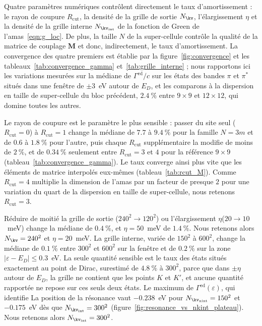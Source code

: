 Quatre paramètres numériques contrôlent directement le taux d'amortissement : le rayon de coupure $R_\text{cut}$, la densité de la grille de sortie $N_\kv$, l'élargissement $\eta$ et la densité de la grille interne $N_{\kv_\text{int}}$ de la fonction de Green de l'amas~\eqref{eqn:g_loc}. De plus, la taille $N$ de la super-cellule contrôle la qualité de la matrice de couplage $\bm M$ et donc, indirectement, le taux d'amortissement. La convergence des quatre premiers est établie par la figure~\ref{fig:convergence} et les tableaux~\ref{tab:convergence_gamma} et~\ref{tab:grille_interne} ; nous rapportons ici les variations mesurées sur la médiane de $\Gamma^\text{ed}/c$ sur les états des bandes $\pi$ et $\pi^*$ situés dans une fenêtre de $\pm 3$~eV autour de $E_D$, et les comparons à la dispersion en taille de super-cellule du bloc précédent, $2.4~\%$ entre $9\times9$ et $12\times12$, qui domine toutes les autres.

Le rayon de coupure est le paramètre le plus sensible : passer du site seul ($R_\text{cut}=0$) à $R_\text{cut}=1$ change la médiane de $7.7$ à $9.4~\%$ pour la famille $N=3m$ et de $0.6$ à $1.8~\%$ pour l'autre, puis chaque $R_\text{cut}$ supplémentaire la modifie de moins de $2~\%$, et de $0.34~\%$ seulement entre $R_\text{cut}=3$ et $4$ pour la référence $9\times9$ (tableau~\ref{tab:convergence_gamma}). Le taux converge ainsi plus vite que les éléments de matrice interpolés eux-mêmes (tableau~\ref{tab:rcut_M}). Comme $R_\text{cut}=4$ multiplie la dimension de l'amas par un facteur de presque $2$ pour une variation du quart de la dispersion en taille de super-cellule, nous retenons $R_\text{cut}=3$. 

Réduire de moitié la grille de sortie ($240^2\to120^2$) ou l'élargissement $\eta$($20\to10$~meV) change la médiane de $0.4~\%$, et $\eta=50$~meV de $1.4~\%$. Nous retenons alors $N_\kv=240^2$ et $\eta=20$~meV. La grille interne, variée de $150^2$ à $600^2$, change la médiane de $0.1~\%$ entre $300^2$ et $600^2$ sur la fenêtre et de $0.2~\%$ sur la zone $|\varepsilon-E_D|\le0.3$~eV. La seule quantité sensible est le taux des états situés exactement au point de Dirac, surestimé de $4.8~\%$ à $300^2$, parce que dans $\pm\eta$ autour de $E_D$, la grille ne contient que les points $K$ et $K'$, et aucune quantité rapportée ne repose sur ces seuls deux états. Le maximum de $\Gamma^\text{ed}(\varepsilon)$, qui identifie La position de la résonance vaut $-0.238$~eV pour $N_{\kv_\text{nint}}=150^2$  et $-0.175$~eV dès que  $N_{\kv_\text{int}}=300^2$ (figure~\ref{fig:resonance_vs_nkint_plateau}). Nous retenons alors $N_{\kv_\text{int}}=300^2$.


